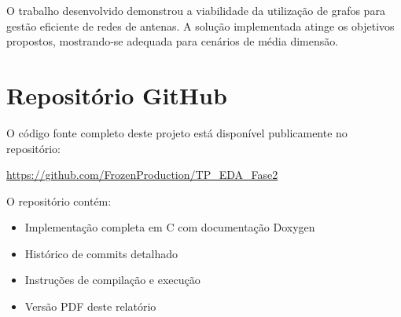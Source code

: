 \documentclass[a4paper,12pt]{report}
\begin{document}
O trabalho desenvolvido demonstrou a viabilidade da utilização de grafos para gestão eficiente de redes de antenas. A solução implementada atinge os objetivos propostos, mostrando-se adequada para cenários de média dimensão. 

\chapter*{Repositório GitHub}
O código fonte completo deste projeto está disponível publicamente no repositório:

\begin{center}
\url{https://github.com/FrozenProduction/TP_EDA_Fase2}
\end{center}

O repositório contém:
\begin{itemize}
\item Implementação completa em C com documentação Doxygen
\item Histórico de commits detalhado
\item Instruções de compilação e execução
\item Versão PDF deste relatório
\end{itemize}
\end{document}
